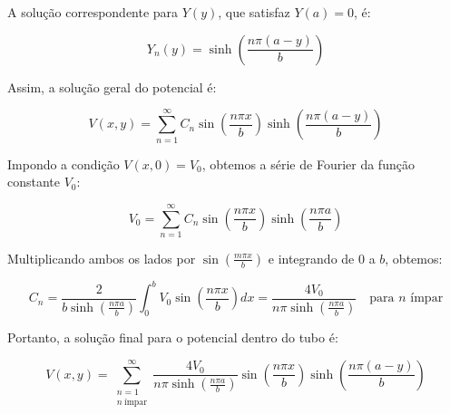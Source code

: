 \documentclass[a4paper,12pt]{article}
\begin{document}
\begin{flushleft}
A solução correspondente para \( Y(y) \), que satisfaz \( Y(a) = 0 \), é:

\begin{equation}
Y_n(y) = \sinh\left( \frac{n\pi (a - y)}{b} \right)
\end{equation}

Assim, a solução geral do potencial é:

\begin{equation}
V(x, y) = \sum_{n=1}^{\infty} C_n \sin\left( \frac{n\pi x}{b} \right) \sinh\left( \frac{n\pi (a - y)}{b} \right)
\end{equation}

Impondo a condição \( V(x, 0) = V_0 \), obtemos a série de Fourier da função constante \( V_0 \):

\begin{equation}
V_0 = \sum_{n=1}^{\infty} C_n \sin\left( \frac{n\pi x}{b} \right) \sinh\left( \frac{n\pi a}{b} \right)
\end{equation}

Multiplicando ambos os lados por \( \sin\left( \frac{m\pi x}{b} \right) \) e integrando de \( 0 \) a \( b \), obtemos:

\begin{equation}
C_n = \frac{2}{b \sinh\left( \frac{n\pi a}{b} \right)} \int_0^b V_0 \sin\left( \frac{n\pi x}{b} \right) dx = \frac{4V_0}{n\pi \sinh\left( \frac{n\pi a}{b} \right)} \quad \text{para } n \text{ ímpar}
\end{equation}

Portanto, a solução final para o potencial dentro do tubo é:

\begin{equation}
\boxed{
V(x, y) = \sum_{\substack{n=1 \\ n\ \text{ímpar}}}^{\infty} \frac{4V_0}{n\pi \sinh\left( \frac{n\pi a}{b} \right)} \sin\left( \frac{n\pi x}{b} \right) \sinh\left( \frac{n\pi (a - y)}{b} \right)
}
\end{equation}
\end{flushleft}
\end{document}
